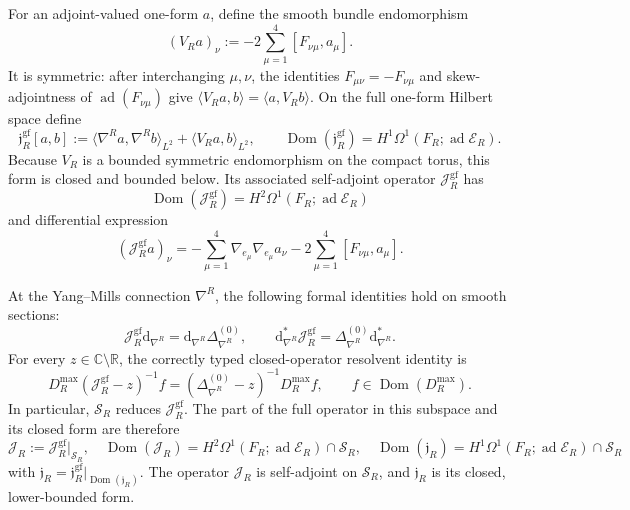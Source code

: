 For an adjoint-valued one-form \(a\), define the smooth bundle
endomorphism
\[
 (V_Ra)_\nu:=-2\sum_{\mu=1}^4[F_{\nu\mu},a_\mu].
\]
It is symmetric: after interchanging \(\mu,\nu\), the identities
\(F_{\mu\nu}=-F_{\nu\mu}\) and skew-adjointness of
\(\operatorname{ad}(F_{\nu\mu})\) give
\(\langle V_Ra,b\rangle=\langle a,V_Rb\rangle\).
On the full one-form Hilbert space define
\begin{equation}
 \mathfrak j_R^{\mathrm{gf}}[a,b]
 :=\langle\nabla^Ra,\nabla^Rb\rangle_{L^2}
   +\langle V_Ra,b\rangle_{L^2},
 \qquad
 \operatorname{Dom}(\mathfrak j_R^{\mathrm{gf}})
 =H^1\Omega^1(F_R;\operatorname{ad}\mathscr E_R).
 \label{cusp-magnetic-full-jacobi-form}
\end{equation}
Because \(V_R\) is a bounded symmetric endomorphism on the compact
torus, this form is closed and bounded below.  Its associated
self-adjoint operator \(\mathcal J_R^{\mathrm{gf}}\) has
\begin{equation}
 \operatorname{Dom}(\mathcal J_R^{\mathrm{gf}})
 =H^2\Omega^1(F_R;\operatorname{ad}\mathscr E_R)
 \label{cusp-magnetic-full-jacobi-domain}
\end{equation}
and differential expression
\[
 (\mathcal J_R^{\mathrm{gf}}a)_\nu
 =-\sum_{\mu=1}^4\nabla_{e_\mu}\nabla_{e_\mu}a_\nu
  -2\sum_{\mu=1}^4[F_{\nu\mu},a_\mu].
\]

\begin{proposition}
\label{cusp-magnetic-jacobi-reduction-proposition}
At the Yang--Mills connection \(\nabla^R\), the following formal
identities hold on smooth sections:
\begin{equation}
 \mathcal J_R^{\mathrm{gf}}\mathrm d_{\nabla^R}
 =\mathrm d_{\nabla^R}\Delta_{\nabla^R}^{(0)},
 \qquad
 \mathrm d_{\nabla^R}^*\mathcal J_R^{\mathrm{gf}}
 =\Delta_{\nabla^R}^{(0)}\mathrm d_{\nabla^R}^*.
 \label{cusp-magnetic-jacobi-intertwining}
\end{equation}
For every \(z\in\mathbb C\setminus\mathbb R\), the correctly typed
closed-operator resolvent identity is
\begin{equation}
 D_R^{\max}(\mathcal J_R^{\mathrm{gf}}-z)^{-1}f
 =(\Delta_{\nabla^R}^{(0)}-z)^{-1}D_R^{\max}f,
 \qquad f\in\operatorname{Dom}(D_R^{\max}).
 \label{cusp-magnetic-jacobi-resolvent-intertwining}
\end{equation}
In particular, \(\mathscr S_R\) reduces
\(\mathcal J_R^{\mathrm{gf}}\).  The part of the full operator in this
subspace and its closed form are therefore
\begin{equation}
 \mathcal J_R
 :=\mathcal J_R^{\mathrm{gf}}\big|_{\mathscr S_R},
 \quad
 \operatorname{Dom}(\mathcal J_R)
 =H^2\Omega^1(F_R;\operatorname{ad}\mathscr E_R)\cap\mathscr S_R,
 \quad
 \operatorname{Dom}(\mathfrak j_R)
 =H^1\Omega^1(F_R;\operatorname{ad}\mathscr E_R)\cap\mathscr S_R
 \label{cusp-magnetic-reduced-jacobi-domain}
\end{equation}
with
\(\mathfrak j_R=\mathfrak j_R^{\mathrm{gf}}|_{\operatorname{Dom}(\mathfrak j_R)}\).
The operator \(\mathcal J_R\) is self-adjoint on \(\mathscr S_R\), and
\(\mathfrak j_R\) is its closed, lower-bounded form.
\end{proposition}

